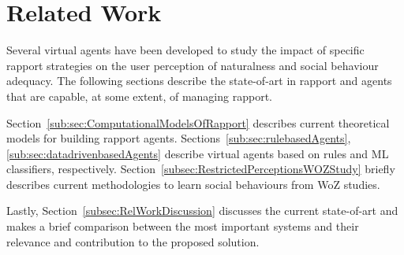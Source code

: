 \section{Related Work}
\label{sec:StateOfTheArt}

Several virtual agents have been developed to study the impact of specific rapport strategies on the user perception of naturalness and social behaviour adequacy. The following sections describe the state-of-art in rapport and agents that are capable, at some extent, of managing rapport.

Section~\ref{sub:sec:ComputationalModelsOfRapport} describes current theoretical models for building rapport agents. Sections~\ref{sub:sec:rulebasedAgents}, \ref{sub:sec:datadrivenbasedAgents} describe virtual agents based on rules and \ac{ML} classifiers, respectively. Section~\ref{subsec:RestrictedPerceptionsWOZStudy} briefly describes current methodologies to learn social behaviours from \ac{WoZ} studies.

Lastly, Section~\ref{subsec:RelWorkDiscussion} discusses the current state-of-art and makes a brief comparison between the most important systems and their relevance and contribution to the proposed solution.





